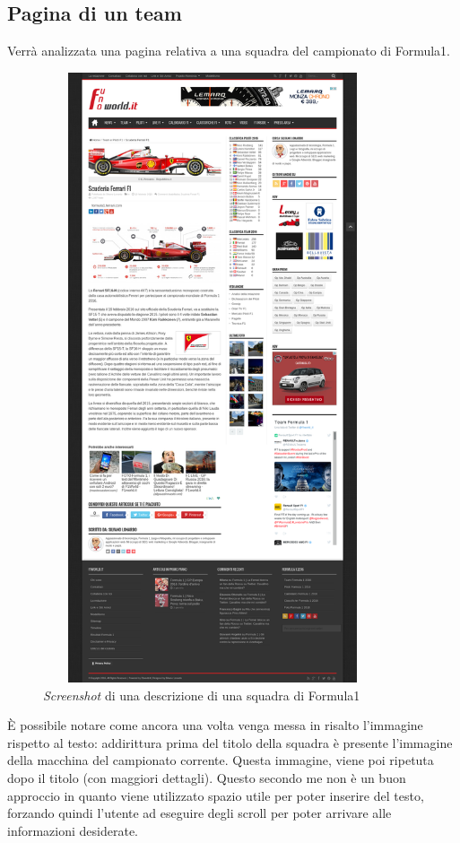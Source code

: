 \subsection{Pagina di un team}
Verrà analizzata una pagina relativa a una squadra del campionato di Formula1.

\begin{figure}[H] %
  \centering
  \includegraphics[height=18cm, width=10cm]{res/img/TeamPage_Full}
  \caption{\textit{Screenshot} di una descrizione di una squadra di Formula1}
\end{figure}

È possibile notare come ancora una volta venga messa in risalto l'immagine
rispetto al testo: addirittura prima del titolo della squadra è presente
l'immagine della macchina del campionato corrente. Questa immagine, viene poi
ripetuta dopo il titolo (con maggiori dettagli). Questo secondo me non è un buon
approccio in quanto viene utilizzato spazio utile per poter inserire del testo,
forzando quindi l'utente ad eseguire degli scroll per poter arrivare alle
informazioni desiderate.

